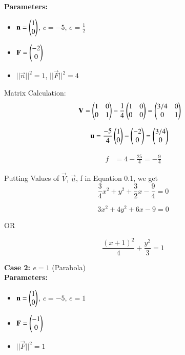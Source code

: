 \documentclass[journal]{IEEEtran}
\begin{document}
\textbf{Parameters:}
\begin{itemize}
\item $\mathbf{n} = \begin{pmatrix}1 \\ 0\end{pmatrix}$, $c = -5$, $e = \frac{1}{2}$
\item $\mathbf{F} = \begin{pmatrix}-2 \\ 0\end{pmatrix}$
\item $||\vec{n}||^2 = 1$, $||\vec{F}||^2 = 4$
\end{itemize}

Matrix Calculation:\\
\begin{align}
\mathbf{V} &= \begin{pmatrix}1 & 0 \\ 0 & 1\end{pmatrix} - \frac{1}{4}\begin{pmatrix}1 & 0 \\ 0 & 0\end{pmatrix} = \begin{pmatrix}3/4 & 0 \\ 0 & 1\end{pmatrix}
\end{align}

\begin{align}
\mathbf{u} &= \frac{-5}{4}\begin{pmatrix}1 \\ 0\end{pmatrix} - \begin{pmatrix}-2 \\ 0\end{pmatrix} = \begin{pmatrix}3/4 \\ 0\end{pmatrix}
\end{align}

\begin{align}
f &= 4 - \frac{25}{4} = -\frac{9}{4}
\end{align}

Putting Values of $\vec{V}, \, \vec{u}$, f in Equation 0.1, we get
\begin{equation}
\frac{3}{4}x^2 + y^2 + \frac{3}{2}x - \frac{9}{4} = 0
\end{equation}


\begin{equation}
\boxed{3x^2 + 4y^2 + 6x - 9 = 0}
\end{equation}

\begin{center}
    OR
\end{center}

\begin{equation}
    \boxed{\dfrac{(x+1)^2}{4} + \dfrac{y^2}{3} = 1}
\end{equation}

\newpage

\textbf{Case 2: $e = 1$} (Parabola)\\
\textbf{Parameters:}
\begin{itemize}
\item $\mathbf{n} = \begin{pmatrix}1 \\ 0\end{pmatrix}$, $c = -5$, $e = 1$
\item $\mathbf{F} = \begin{pmatrix}-1 \\ 0\end{pmatrix}$
\item $||\vec{F}||^2 = 1$
\end{itemize}
\end{document}
